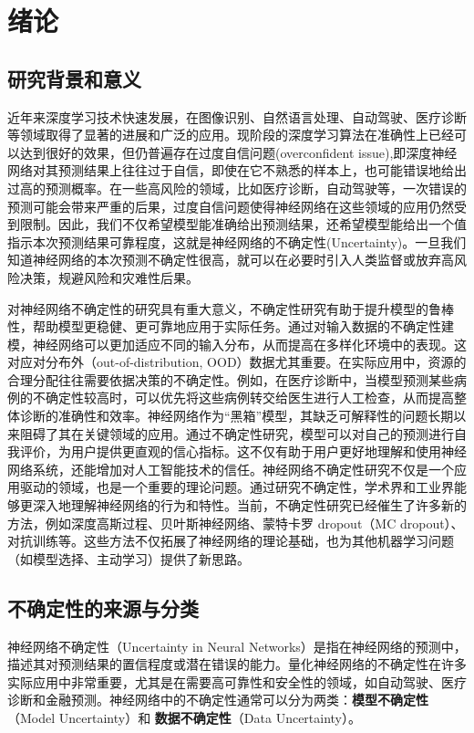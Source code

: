 \chapter{绪论}
\section{研究背景和意义}
近年来深度学习技术快速发展，在图像识别、自然语言处理、自动驾驶、医疗诊断等领域取得了显著的进展和广泛的应用。现阶段的深度学习算法在准确性上已经可以达到很好的效果，但仍普遍存在过度自信问题(overconfident issue),即深度神经网络对其预测结果上往往过于自信，即使在它不熟悉的样本上，也可能错误地给出过高的预测概率。在一些高风险的领域，比如医疗诊断，自动驾驶等，一次错误的预测可能会带来严重的后果，过度自信问题使得神经网络在这些领域的应用仍然受到限制。因此，我们不仅希望模型能准确给出预测结果，还希望模型能给出一个值指示本次预测结果可靠程度，这就是神经网络的不确定性(Uncertainty)。一旦我们知道神经网络的本次预测不确定性很高，就可以在必要时引入人类监督或放弃高风险决策，规避风险和灾难性后果。

对神经网络不确定性的研究具有重大意义，不确定性研究有助于提升模型的鲁棒性，帮助模型更稳健、更可靠地应用于实际任务。通过对输入数据的不确定性建模，神经网络可以更加适应不同的输入分布，从而提高在多样化环境中的表现。这对应对分布外（out-of-distribution, OOD）数据尤其重要。在实际应用中，资源的合理分配往往需要依据决策的不确定性。例如，在医疗诊断中，当模型预测某些病例的不确定性较高时，可以优先将这些病例转交给医生进行人工检查，从而提高整体诊断的准确性和效率。神经网络作为“黑箱”模型，其缺乏可解释性的问题长期以来阻碍了其在关键领域的应用。通过不确定性研究，模型可以对自己的预测进行自我评价，为用户提供更直观的信心指标。这不仅有助于用户更好地理解和使用神经网络系统，还能增加对人工智能技术的信任。神经网络不确定性研究不仅是一个应用驱动的领域，也是一个重要的理论问题。通过研究不确定性，学术界和工业界能够更深入地理解神经网络的行为和特性。当前，不确定性研究已经催生了许多新的方法，例如深度高斯过程、贝叶斯神经网络、蒙特卡罗 dropout（MC dropout）、对抗训练等。这些方法不仅拓展了神经网络的理论基础，也为其他机器学习问题（如模型选择、主动学习）提供了新思路。


\section{不确定性的来源与分类}
神经网络不确定性（Uncertainty in Neural Networks）是指在神经网络的预测中，描述其对预测结果的置信程度或潜在错误的能力。量化神经网络的不确定性在许多实际应用中非常重要，尤其是在需要高可靠性和安全性的领域，如自动驾驶、医疗诊断和金融预测。神经网络中的不确定性通常可以分为两类\cite{abdar2021review}：\textbf{模型不确定性}（Model Uncertainty）和\textbf{ 数据不确定性}（Data Uncertainty）。


